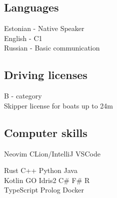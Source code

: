 \documentclass[letterpaper]{deedy-resume} %
\begin{document}
\begin{minipage}[t]{0.33\textwidth}
\subsection{Languages}

Estonian - Native Speaker \\
English - C1 \\
Russian - Basic communication \\

\sectionspace %


\subsection{Driving licenses}

B - category \\
Skipper license for boats up to 24m \\

\sectionspace %

\subsection{Computer skills}

Neovim \textbullet{} CLion/IntelliJ \textbullet{} VSCode \\

\sectionspace

Rust \textbullet{} C++ \textbullet{} Python \textbullet{} Java \\
Kotlin \textbullet{} GO \textbullet{} Idris2 \textbullet{} C\# \textbullet{} F\# \textbullet{} R \\
TypeScript \textbullet{} Prolog \textbullet{} Docker


\sectionspace %


\end{minipage} %
\hfill
%
%
\end{document}
